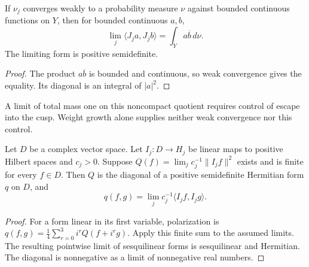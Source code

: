 \begin{proposition}
\label{v4-arith:w6-b:prop:Kk-asymptotic}
If $\nu_j$ converges weakly to a probability measure $\nu$ against
bounded continuous functions on $Y$, then for bounded continuous
$a,b$,
\begin{equation}
\label{v4-arith:w6-b:eq:Kk-asymptotic}
 \lim_j\langle J_ja,J_jb\rangle=\int_Ya\overline b\,d\nu.
\end{equation}
The limiting form is positive semidefinite.
\end{proposition}
\begin{proof}
The product $a\overline b$ is bounded and continuous, so weak
convergence gives the equality. Its diagonal is an integral of $|a|^2$.
\end{proof}

A limit of total mass one on this noncompact quotient requires
control of escape into the cusp. Weight growth alone supplies
neither weak convergence nor this control.

\begin{theorem}
\label{v4-arith:w6-b:thm:weight-limit}
Let $D$ be a complex vector space. Let $I_j:D\to H_j$ be linear
maps to positive Hilbert spaces and $c_j>0$.
Suppose $Q(f)=\lim_j c_j^{-1}\|I_jf\|^2$ exists and is finite
for every $f\in D$. Then $Q$ is the diagonal of a positive
semidefinite Hermitian form $q$ on $D$, and
\begin{equation}
\label{v4-arith:w6-b:eq:weight-limit}
 q(f,g)=\lim_jc_j^{-1}\langle I_jf,I_jg\rangle.
\end{equation}
\end{theorem}
\begin{proof}
For a form linear in its first variable, polarization is
$q(f,g)=\frac14\sum_{r=0}^3i^r Q(f+i^rg)$.
Apply this finite sum to the assumed limits. The resulting pointwise
limit of sesquilinear forms is sesquilinear and Hermitian.
The diagonal is nonnegative as a limit of nonnegative real numbers.
\end{proof}

